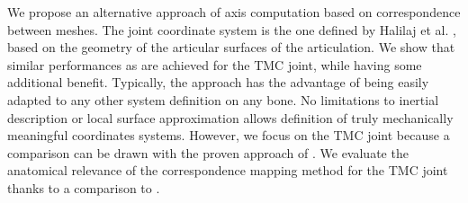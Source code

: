 We propose an alternative approach of axis computation based on correspondence between meshes. The joint coordinate system is the one defined by Halilaj et al. \cite{halilaj_2013_thumb}, based on the geometry of the articular surfaces of the articulation. We show that similar performances as \cite{halilaj_2013_thumb} are achieved for the TMC joint, while having some additional benefit. Typically, the approach has the advantage of being easily adapted to any other system definition on any bone.  No limitations to inertial description or local surface approximation allows definition of truly mechanically meaningful coordinates systems. However, we focus on the TMC joint because a comparison can be drawn with the proven approach of \cite{halilaj_2013_thumb}. We evaluate the anatomical relevance of the correspondence mapping method for the TMC joint thanks to a comparison to \cite{halilaj_2013_thumb}.



